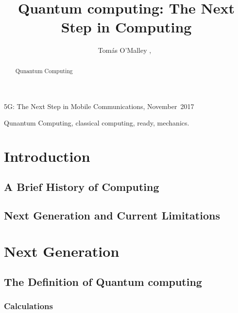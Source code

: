 \documentclass[journal]{IEEEtran}
\begin{document}
%
{5G: The Next Step in Mobile Communications, November~2017}

\title{Quantum computing: The Next Step in Computing}
\author{Tomás O'Malley ,~%
}

\maketitle

\begin{abstract}
Qunantum Computing

\end{abstract}
\begin{IEEEkeywords}
Qunantum Computing, classical computing, ready, mechanics.
\end{IEEEkeywords}

\section{Introduction}


\subsection{A Brief History of Computing }


\subsection{Next  Generation and Current Limitations} \label{subsec:4g}


\section{Next Generation}


\subsection{The Definition of 	Quantum computing} \label{subsec:def5g}

\subsubsection{Calculations}
\end{document}
